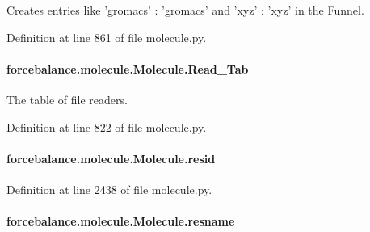 Creates entries like 'gromacs' \-: 'gromacs' and 'xyz' \-: 'xyz' in the Funnel. 



Definition at line 861 of file molecule.\-py.

\hypertarget{classforcebalance_1_1molecule_1_1Molecule_a35600d98f150597c9d9ac5129e01bd8d}{
\paragraph[{Read\-\_\-\-Tab}]{\setlength{\rightskip}{0pt plus 5cm}forcebalance.\-molecule.\-Molecule.\-Read\-\_\-\-Tab}}\label{classforcebalance_1_1molecule_1_1Molecule_a35600d98f150597c9d9ac5129e01bd8d}


The table of file readers. 



Definition at line 822 of file molecule.\-py.

\hypertarget{classforcebalance_1_1molecule_1_1Molecule_a7ce0cbbc2f774aaffe3b6ca78b658736}{
\paragraph[{resid}]{\setlength{\rightskip}{0pt plus 5cm}forcebalance.\-molecule.\-Molecule.\-resid}}\label{classforcebalance_1_1molecule_1_1Molecule_a7ce0cbbc2f774aaffe3b6ca78b658736}


Definition at line 2438 of file molecule.\-py.

\hypertarget{classforcebalance_1_1molecule_1_1Molecule_ac1def400d819601483ddf475f1389a8d}{
\paragraph[{resname}]{\setlength{\rightskip}{0pt plus 5cm}forcebalance.\-molecule.\-Molecule.\-resname}}\label{classforcebalance_1_1molecule_1_1Molecule_ac1def400d819601483ddf475f1389a8d}


